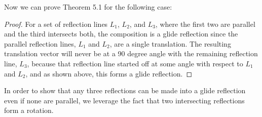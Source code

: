 \documentclass[11pt]{article}
\theoremstyle{definition}
\begin{document}
Now we can prove Theorem 5.1 for the following case:

\begin{proof}
  For a set of reflection lines $L_{1}$, $L_{2}$, and $L_{3}$, where the first
  two are parallel and the third intersects both, the composition is a glide
  reflection since the parallel reflection lines, $L_{1}$ and $L_{2}$, are a
  single translation. The resulting translation vector will never be at a 90
  degree angle with the remaining reflection line, $L_{3}$, because that
  reflection line started off at some angle with respect to $L_{1}$ and
  $L_{2}$, and as shown above, this forms a glide reflection.
\end{proof}

In order to show that any three reflections can be made into a glide
reflection even if none are parallel, we leverage the fact that two
intersecting reflections form a rotation.
\end{document}
